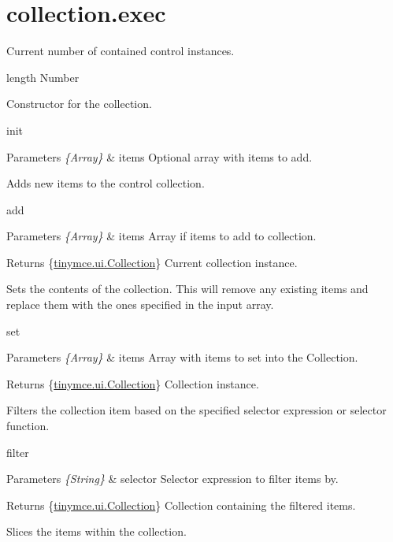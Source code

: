 \hypertarget{collection_8exec-example}{\section{collection.\+exec}
}
Current number of contained control instances.

length  Number

Constructor for the collection.

init 
\begin{DoxyParams}{Parameters}
{\em \{\+Array\}} & items Optional array with items to add.\\
\hline
\end{DoxyParams}
Adds new items to the control collection.

add 
\begin{DoxyParams}{Parameters}
{\em \{\+Array\}} & items Array if items to add to collection. \\
\hline
\end{DoxyParams}
\begin{DoxyReturn}{Returns}
\{\hyperlink{classtinymce_1_1ui_1_1_collection}{tinymce.\+ui.\+Collection}\} Current collection instance.
\end{DoxyReturn}
Sets the contents of the collection. This will remove any existing items and replace them with the ones specified in the input array.

set 
\begin{DoxyParams}{Parameters}
{\em \{\+Array\}} & items Array with items to set into the Collection. \\
\hline
\end{DoxyParams}
\begin{DoxyReturn}{Returns}
\{\hyperlink{classtinymce_1_1ui_1_1_collection}{tinymce.\+ui.\+Collection}\} Collection instance.
\end{DoxyReturn}
Filters the collection item based on the specified selector expression or selector function.

filter 
\begin{DoxyParams}{Parameters}
{\em \{\+String\}} & selector Selector expression to filter items by. \\
\hline
\end{DoxyParams}
\begin{DoxyReturn}{Returns}
\{\hyperlink{classtinymce_1_1ui_1_1_collection}{tinymce.\+ui.\+Collection}\} Collection containing the filtered items.
\end{DoxyReturn}
Slices the items within the collection.

